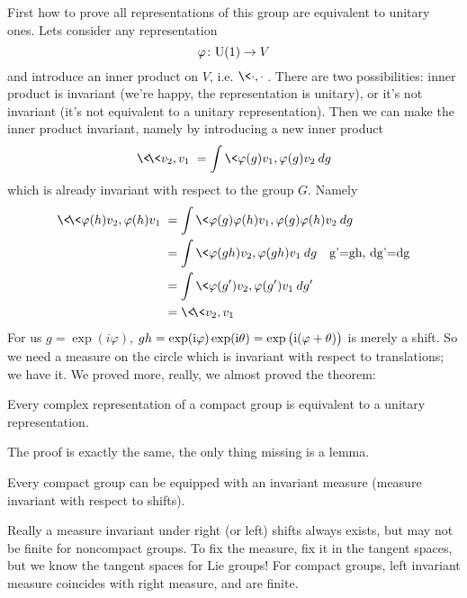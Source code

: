 First how to prove all representations of this group are
equivalent to unitary ones. Lets consider any representation
\begin{equation}
\varphi\colon {\rm U}(1)\to V
\end{equation}
and introduce an inner product on $V$,
i.e. $\<\cdot,\cdot\>$. There are two possibilities: inner
product is invariant (we're happy, the representation is
unitary), or it's not invariant (it's not equivalent to a unitary
representation). Then we can make the inner product invariant,
namely by introducing a new inner product
\begin{equation}
\<\!\< v_{2},v_{1}\>\!\> = \int \<\varphi(g)v_{1},\varphi(g)v_{2}\>dg
\end{equation}
which is already invariant with respect to the group $G$. Namely
\begin{subequations}
\begin{align}
\<\!\<\varphi(h) v_{2},\varphi(h)v_{1}\>\!\> &= \int \<\varphi(g)\varphi(h)v_{1},\varphi(g)\varphi(h)v_{2}\>dg\\
&=\int\<\varphi(gh)v_{2},\varphi(gh)v_{1}\>dg\quad\mbox{g'=gh,
  dg'=dg}\\
&=\int\<\varphi(g')v_{2},\varphi(g')v_{1}\>dg'\\
&=\<\!\<v_{2},v_{1}\>\!\>
\end{align}
\end{subequations}
For us $g=\exp(i\varphi)$,
$gh=\exp(\mathrm{i}\varphi)\exp(\mathrm{i}\theta)=\exp\big(\mathrm{i}(\varphi+\theta)\big)$
is merely a shift. So we need a measure on the circle which is
invariant with respect to translations; we have it. We proved
more, really, we almost proved the theorem:
\begin{thm}
Every complex representation of a compact group is equivalent to a
unitary representation.
\end{thm}
The proof is exactly the same, the only thing missing is a lemma.
\begin{lem}
Every compact group can be equipped with an invariant measure
(measure invariant with respect to shifts).
\end{lem}
Really a measure invariant under right (or left) shifts always
exists, but may not be finite for noncompact groups. To fix the
measure, fix it in the tangent spaces, but we know the tangent
spaces for Lie groups! For compact groups, left invariant measure
coincides with right measure, and are finite.
